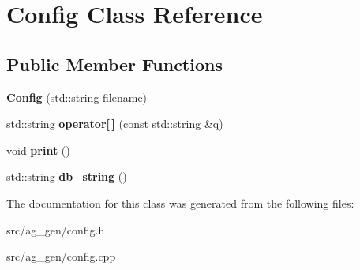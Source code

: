 \hypertarget{class_config}{}\section{Config Class Reference}
\label{class_config}
\subsection*{Public Member Functions}
\begin{DoxyCompactItemize}
\item 
\mbox{\label{class_config_aabd4efaa4f4d31be866a8e949cbb6c5b}} 
{\bfseries Config} (std\+::string filename)
\item 
\mbox{\label{class_config_ac37fd0d76799e50720733d0a2b363c50}} 
std\+::string {\bfseries operator\mbox{[}$\,$\mbox{]}} (const std\+::string \&q)
\item 
\mbox{\label{class_config_a145fb48e8056b0f8f5ce92d6184e73f9}} 
void {\bfseries print} ()
\item 
\mbox{\label{class_config_a6372005e420ed1f57f1f53db7acdd631}} 
std\+::string {\bfseries db\+\_\+string} ()
\end{DoxyCompactItemize}


The documentation for this class was generated from the following files\+:\begin{DoxyCompactItemize}
\item 
src/ag\+\_\+gen/config.\+h\item 
src/ag\+\_\+gen/config.\+cpp\end{DoxyCompactItemize}
